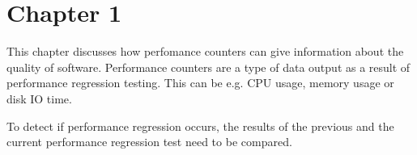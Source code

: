 \documentclass[oneside]{book}
\begin{document}
\clearpage %
\tableofcontents

\clearpage %
\listoffigures

\clearpage %
\listoftables

\mainmatter
% 


\chapter{Chapter 1}
\label{chapter:first}

This chapter discusses how perfomance counters can give information about the quality of software. Performance counters are a type of data output as a result of performance regression testing. This can be e.g. CPU usage, memory usage or disk IO time.

To detect if performance regression occurs, the results of the previous and the current performance regression test need to be compared.




\newpage
% 

\appendix



\backmatter

{}



\end{document}
